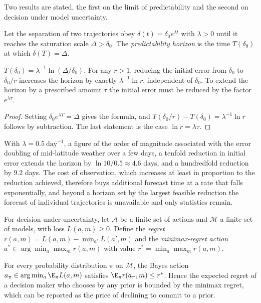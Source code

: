 Two results are stated, the first on the limit of predictability and the second on decision under model uncertainty.

\begin{definition}
Let the separation of two trajectories obey $\delta(t)=\delta_0e^{\lambda t}$ with $\lambda>0$ until it reaches the saturation scale $\Delta>\delta_0$. The \emph{predictability horizon} is the time $T(\delta_0)$ at which $\delta(T)=\Delta$.
\end{definition}

\begin{proposition}
$T(\delta_0)=\lambda^{-1}\ln(\Delta/\delta_0)$. For any $r>1$, reducing the initial error from $\delta_0$ to $\delta_0/r$ increases the horizon by exactly $\lambda^{-1}\ln r$, independent of $\delta_0$. To extend the horizon by a prescribed amount $\tau$ the initial error must be reduced by the factor $e^{\lambda\tau}$.
\end{proposition}

\begin{proof}
Setting $\delta_0e^{\lambda T}=\Delta$ gives the formula, and $T(\delta_0/r)-T(\delta_0)=\lambda^{-1}\ln r$ follows by subtraction. The last statement is the case $\ln r=\lambda\tau$.
\end{proof}

With $\lambda=0.5\ \mathrm{day^{-1}}$, a figure of the order of magnitude associated with the error doubling of mid-latitude weather over a few days, a tenfold reduction in initial error extends the horizon by $\ln10/0.5\approx4.6$ days, and a hundredfold reduction by $9.2$ days. The cost of observation, which increases at least in proportion to the reduction achieved, therefore buys additional forecast time at a rate that falls exponentially, and beyond a horizon set by the largest feasible reduction the forecast of individual trajectories is unavailable and only statistics remain.

For decision under uncertainty, let $\mathcal A$ be a finite set of actions and $\mathcal M$ a finite set of models, with loss $L(a,m)\ge0$. Define the \emph{regret} $r(a,m)=L(a,m)-\min_{a'}L(a',m)$ and the \emph{minimax-regret action} $a^\ast\in\arg\min_a\max_mr(a,m)$ with value $r^\ast=\min_a\max_mr(a,m)$.

\begin{proposition}
For every probability distribution $\pi$ on $\mathcal M$, the Bayes action $a_\pi\in\arg\min_a\E_\pi L(a,m)$ satisfies $\E_\pi r(a_\pi,m)\le r^\ast$. Hence the expected regret of a decision maker who chooses by any prior is bounded by the minimax regret, which can be reported as the price of declining to commit to a prior.
\end{proposition}

